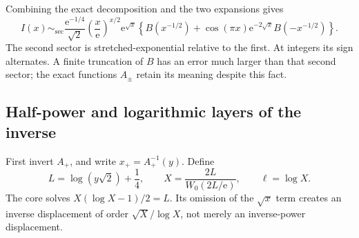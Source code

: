 \documentclass[11pt,a4paper]{article}
\numberwithin{equation}{section}
\theoremstyle{definition}
\theoremstyle{remark}
\newcommand{\ee}{\mathrm e}
\newcommand{\sectorsim}{\mathrel{\sim_{\mathrm{sec}}}}
\begin{document}
Combining the exact decomposition and the two expansions gives
\begin{equation}
 I(x)\sectorsim
 \frac{\ee^{-1/4}}{\sqrt2}\left(\frac{x}{\ee}\right)^{x/2}\ee^{\sqrt x}
 \left\{B(x^{-1/2})+\cos(\pi x)\ee^{-2\sqrt x}B(-x^{-1/2})\right\}.
 \label{eq:involution-transseries}
\end{equation}
The second sector is stretched-exponential relative to the first. At integers its sign alternates. A finite truncation of $B$ has an error much larger than that second sector; the exact functions $A_\pm$ retain its meaning despite this fact.

\subsection{Half-power and logarithmic layers of the inverse}

First invert $A_+$, and write $x_+=A_+^{-1}(y)$. Define
\begin{equation}
 L=\log(y\sqrt2)+\frac14,\qquad
 X=\frac{2L}{W_0(2L/\ee)},\qquad \ell=\log X.
 \label{eq:involution-core}
\end{equation}
The core solves $X(\log X-1)/2=L$. Its omission of the $\sqrt x$ term creates an inverse displacement of order $\sqrt X/\log X$, not merely an inverse-power displacement.
\end{document}
